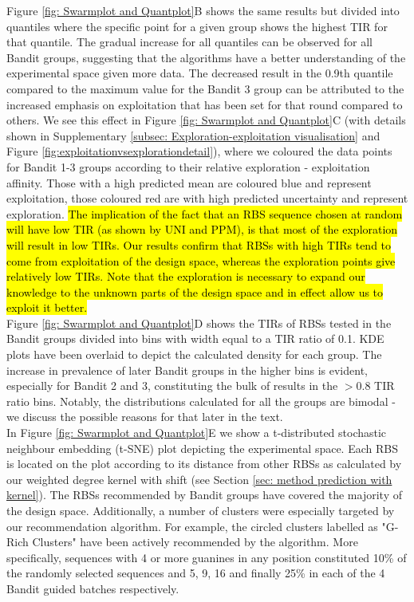 \documentclass{article}
\begin{document}
Figure \ref{fig: Swarmplot and Quantplot}B shows the same results but divided into quantiles where the specific point for a given group shows the highest TIR for that quantile.
The gradual increase for all quantiles can be observed for all Bandit groups, suggesting that the algorithms have a better understanding of the experimental space given more data.
The decreased result in the 0.9th quantile compared to the maximum value for the Bandit 3 group can be attributed to the increased emphasis on exploitation that has been set for that round compared to others.
We see this effect in Figure \ref{fig: Swarmplot and Quantplot}C (with details shown in Supplementary \ref{subsec: Exploration-exploitation visualisation} and Figure  \ref{fig:exploitationvsexplorationdetail}), where we coloured the data points for Bandit 1-3 groups according to their relative exploration - exploitation affinity.
Those with a high predicted mean are coloured blue and represent exploitation, those coloured red are with high predicted uncertainty and represent exploration.
\hl{The implication of the fact that an RBS sequence chosen at random will have low TIR
(as shown by UNI and PPM), is that most of the exploration will result in low TIRs.
Our results confirm that RBSs with high TIRs tend to come from exploitation of the design space,
whereas the exploration points give relatively low TIRs.
Note that the exploration is necessary to expand our knowledge to the unknown parts of the design space and in effect allow us to exploit it better.}\\

Figure \ref{fig: Swarmplot and Quantplot}D shows the TIRs of RBSs tested in the Bandit groups divided into bins with width equal to a TIR ratio of 0.1.
KDE plots have been overlaid to depict the calculated density for each group.
The increase in prevalence of later Bandit groups in the higher bins is evident, especially for Bandit 2 and 3, constituting the bulk of results in the $>0.8$ TIR ratio bins.
Notably, the distributions calculated for all the groups are bimodal - we discuss the possible reasons for that later in the text.\\


In Figure \ref{fig: Swarmplot and Quantplot}E we show a t-distributed stochastic neighbour embedding (t-SNE) \mbox{\cite{tsne2008}} plot depicting the experimental space.
Each RBS is located on the plot according to its distance from other RBSs as calculated by our weighted degree kernel with shift (see Section \mbox{\ref{sec: method prediction with kernel}}).
The RBSs recommended by Bandit groups have covered the majority of the design space.
Additionally, a number of clusters were especially targeted by our recommendation algorithm.
For example, the circled clusters labelled as "G-Rich Clusters" have been actively recommended by the algorithm.
More specifically, sequences with 4 or more guanines in any position constituted 10\% of the randomly selected sequences and 5, 9, 16 and finally 25\% in each of the 4 Bandit guided batches respectively.
\end{document}
